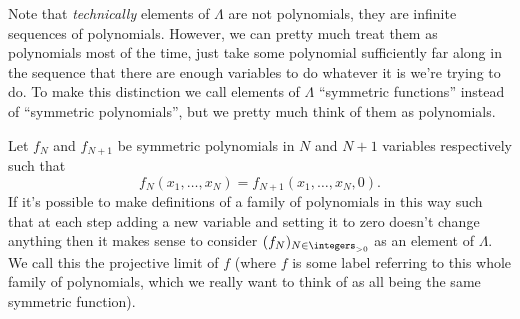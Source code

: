 \documentclass[fleqn]{NotesClass}
\begin{document}
    \begin{remark}{}{}
        Note that \emph{technically} elements of \(\Lambda\) are not polynomials, they are infinite sequences of polynomials.
        However, we can pretty much treat them as polynomials most of the time, just take some polynomial sufficiently far along in the sequence that there are enough variables to do whatever it is we're trying to do.
        To make this distinction we call elements of \(\Lambda\) \enquote{symmetric functions} instead of \enquote{symmetric polynomials}, but we pretty much think of them as polynomials.
        
        Let \(f_N\) and \(f_{N+1}\) be symmetric polynomials in \(N\) and \(N + 1\) variables respectively such that
        \begin{equation}
            f_N(x_1, \dotsc, x_N) = f_{N+1}(x_1, \dotsc, x_N, 0).
        \end{equation}
        If it's possible to make definitions of a family of polynomials in this way such that at each step adding a new variable and setting it to zero doesn't change anything then it makes sense to consider \((f_N)_{N \in \integers_{>0}}\) as an element of \(\Lambda\).
        We call this the projective limit of \(f\) (where \(f\) is some label referring to this whole family of polynomials, which we really want to think of as all being the same symmetric function).
    \end{remark}
    
\end{document}
